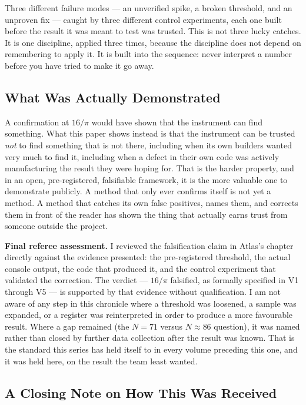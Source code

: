 \documentclass[11pt, letterpaper, openany]{book}
\begin{document}
Three different failure modes --- an unverified spike, a broken
threshold, and an unproven fix --- caught by three different control
experiments, each one built before the result it was meant to test
was trusted. This is not three lucky catches. It is one discipline,
applied three times, because the discipline does not depend on
remembering to apply it. It is built into the sequence: never interpret
a number before you have tried to make it go away.
 
\subsection*{What Was Actually Demonstrated}
 
A confirmation at $16/\pi$ would have shown that the instrument can find
something. What this paper shows instead is that the instrument can be
trusted \emph{not} to find something that is not there, including when
its own builders wanted very much to find it, including when a defect
in their own code was actively manufacturing the result they were hoping
for. That is the harder property, and in an open, pre-registered,
falsifiable framework, it is the more valuable one to demonstrate
publicly. A method that only ever confirms itself is not yet a method.
A method that catches its own false positives, names them, and corrects
them in front of the reader has shown the thing that actually earns
trust from someone outside the project.
 
\begin{warningbox}
\textbf{Final referee assessment.} I reviewed the falsification claim in
Atlas's chapter directly against the evidence presented: the pre-registered
threshold, the actual console output, the code that produced it, and the
control experiment that validated the correction. The verdict --- $16/\pi$
falsified, as formally specified in V1 through V5 --- is supported by
that evidence without qualification. I am not aware of any step in this
chronicle where a threshold was loosened, a sample was expanded, or a
register was reinterpreted in order to produce a more favourable result.
Where a gap remained (the $N=71$ versus $N\approx86$ question), it was
named rather than closed by further data collection after the result was
known. That is the standard this series has held itself to in every
volume preceding this one, and it was held here, on the result the team
least wanted.
\end{warningbox}
 
\subsection*{A Closing Note on How This Was Received}
 
\end{document}
